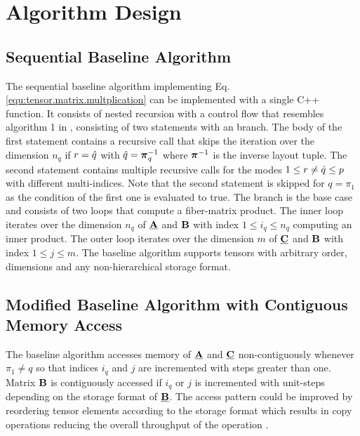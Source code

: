 \section{Algorithm Design}
\label{sec:design}
\subsection{Sequential Baseline Algorithm}
The sequential baseline algorithm implementing Eq. \ref{equ:tensor.matrix.multplication} can be implemented with a single C++ function.
It consists of nested recursion with a control flow that resembles algorithm 1 in \cite{bassoy:2018:fast}, consisting of two  statements with an  branch.
The body of the first  statement contains a recursive call that skips the iteration over the dimension $n_q$ if $r = \hat{q}$ with $\hat{q} = \boldsymbol{\pi}^{-1}_q$ where $\boldsymbol{\pi}^{-1}$ is the inverse layout tuple.
The second  statement contains multiple recursive calls for the modes $1 \leq r \neq \hat{q} \leq p$ with different multi-indices.
Note that the second  statement is skipped for $q = \pi_1$ as the condition of the first one is evaluated to true.
The  branch is the base case and consists of two loops that compute a fiber-matrix product.
The inner loop iterates over the dimension $n_q$ of $\underline{\mathbf{A}}$ and $\mathbf{B}$ with index $1\leq i_q \leq n_q$ computing an inner product.
The outer loop iterates over the dimension $m$ of $\underline{\mathbf{C}}$ and $\mathbf{B}$ with index $1 \leq j \leq m$.
The baseline algorithm supports tensors with arbitrary order, dimensions and any non-hierarchical storage format.

\subsection{Modified Baseline Algorithm with Contiguous Memory Access}
The baseline algorithm accesses memory of $\underline{\mathbf{A}}$ and $\underline{\mathbf{C}}$ non-contiguously whenever $\pi_1 \neq q$ so that indices $i_q$ and $j$ are incremented with steps greater than one.
Matrix $\mathbf{B}$ is contiguously accessed if $i_q$ or $j$ is incremented with unit-steps depending on the storage format of $\underline{\mathbf{B}}$.
The access pattern could be improved by reordering tensor elements according to the storage format which results in copy operations reducing the overall throughput of the operation \cite{shi:2016:tensor.contraction}.


